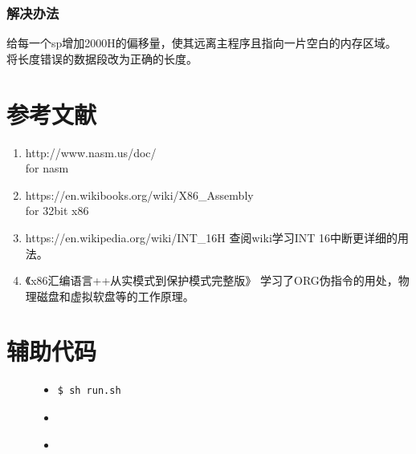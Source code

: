 \documentclass[a4paper]{article}
\begin{document}
    \subsubsection{解决办法}
    给每一个sp增加2000H的偏移量，使其远离主程序且指向一片空白的内存区域。\\
    
    将长度错误的数据段改为正确的长度。
        

\begin{appendices}
\section{参考文献} \label{sec:reference}
\begin{enumerate}
    \item http://www.nasm.us/doc/ \\
    for nasm
    \item https://en.wikibooks.org/wiki/X86\_Assembly \\
    for 32bit x86
    \item https://en.wikipedia.org/wiki/INT\_16H
    查阅wiki学习INT 16中断更详细的用法。
    \item 《x86汇编语言++从实模式到保护模式完整版》
    学习了ORG伪指令的用处，物理磁盘和虚拟软盘等的工作原理。
  \end{enumerate}
    \section{辅助代码}\label{sec:utilitycode}
    \begin{figure}[H]
    \begin{itemize}
    \item[] \begin{lstlisting}[language=sh, label=lst:run, caption=运行本项目的方法]
$ sh run.sh
    \end{lstlisting}
    \end{itemize}
    \end{figure}
    \begin{figure}[H]
    \begin{itemize}
        \item[]
    \end{itemize}
    \end{figure}

    \begin{figure}[H]
    \begin{itemize}
        \item[]
    \end{itemize}
    \end{figure}


\end{appendices}
\end{document}
